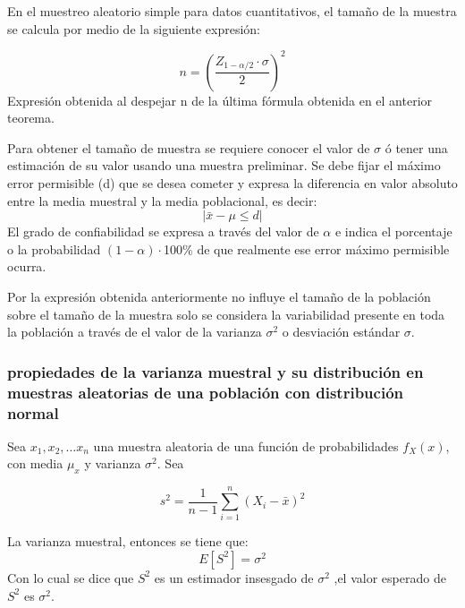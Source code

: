 \begin{corollary}
    En el muestreo aleatorio
    simple para datos cuantitativos, el
    tamaño de la muestra se calcula por
    medio de la siguiente expresión:

    \begin{equation}
        n=\left(\frac{Z_{1-\alpha/2}\cdot  \sigma }{2}\right)^2
    \end{equation}
    Expresión obtenida al despejar n de la última fórmula obtenida en el anterior
    teorema.
\end{corollary}

Para obtener el tamaño de muestra se requiere conocer el valor
de $\sigma$  ó tener una estimación de su valor usando una muestra
preliminar.
Se debe fijar el máximo error permisible (d) que se desea
cometer y expresa la diferencia en valor absoluto entre la media
muestral y la media poblacional, es decir:
\begin{equation*}
    \left\lvert \bar{x}-\mu\leq d\right\rvert
\end{equation*}
El grado de confiabilidad se expresa a través del valor de $\alpha $ e
indica el porcentaje o la probabilidad $(1-\alpha )\cdot$100\% de que
realmente ese error máximo permisible ocurra.

Por la expresión obtenida anteriormente no influye el tamaño de
la población sobre el tamaño de la muestra solo se considera la
variabilidad presente en toda la población a través de el valor de
la varianza $\sigma^2$ o desviación estándar $\sigma$.

\subsubsection{propiedades de la varianza muestral y su distribución en muestras aleatorias de una población con distribución normal}


Sea $x_1,x_2,\dots x_n$ una muestra aleatoria de una función
de probabilidades $f_X(x)$, con media $\mu_x$ y varianza $\sigma^2$.
Sea

\begin{equation}
    s^2=\frac{1}{n-1} \sum_{i=1}^n\left( X_i-\bar{x} \right)^2
\end{equation}

La varianza muestral, entonces se tiene que:
\begin{equation}
    E[S^2]=\sigma^2
\end{equation}
Con lo cual se dice que $S^2$ es un estimador insesgado
de $\sigma^2$ ,el valor esperado de $S^2$ es $\sigma^2$.

